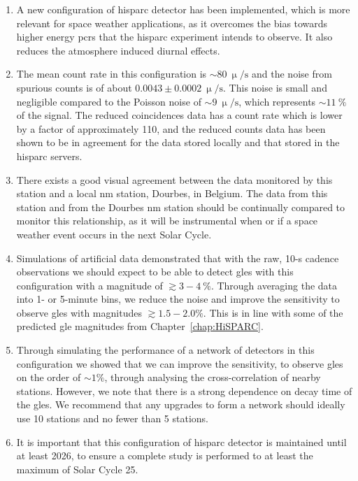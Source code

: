 \begin{enumerate}
	\item{A new configuration of \gls{hisparc} detector has been implemented, which is more relevant for space weather applications, as it overcomes the bias towards higher energy \glspl{pcr} that the \gls{hisparc} experiment intends to observe. It also reduces the atmosphere induced diurnal effects.}%

	\item{The mean count rate in this configuration is $\sim80~\upmu/\mathrm{s}$ and the noise from spurious counts is of about $0.0043\pm0.0002~\upmu/\mathrm{s}$. This noise is small and negligible compared to the Poisson noise of $\sim9~\upmu/\mathrm{s}$, which represents $\sim11~\%$ of the signal. The reduced coincidences data has a count rate which is lower by a factor of approximately 110, and the reduced counts data has been shown to be in agreement for the data stored locally and that stored in the \gls{hisparc} servers.}
	
	\item{There exists a good visual agreement between the data monitored by this station and a local \gls{nm} station, Dourbes, in Belgium. The data from this station and from the Dourbes \gls{nm} station should be continually compared to monitor this relationship, as it will be instrumental when or if a space weather event occurs in the next Solar Cycle.}
	
	\item{Simulations of artificial data demonstrated that with the raw, 10-s cadence observations we should expect to be able to detect \glspl{gle} with this configuration with a magnitude of $\gtrsim3-4~\%$. Through averaging the data into 1- or 5-minute bins, we reduce the noise and improve the sensitivity to observe \glspl{gle} with magnitudes $\gtrsim1.5-2.0 \%$. This is in line with some of the predicted \gls{gle} magnitudes from Chapter~\ref{chap:HiSPARC}.}
	
	\item{Through simulating the performance of a network of detectors in this configuration we showed that we can improve the sensitivity, to observe \glspl{gle} on the order of $\sim 1 \%$, through analysing the cross-correlation of nearby stations. However, we note that there is a strong dependence on decay time of the \glspl{gle}. We recommend that any upgrades to form a network should ideally use 10 stations and no fewer than 5 stations.}
	
	\item{It is important that this configuration of \gls{hisparc} detector is maintained until at least 2026, to ensure a complete study is performed to at least the maximum of Solar Cycle 25.}
\end{enumerate}